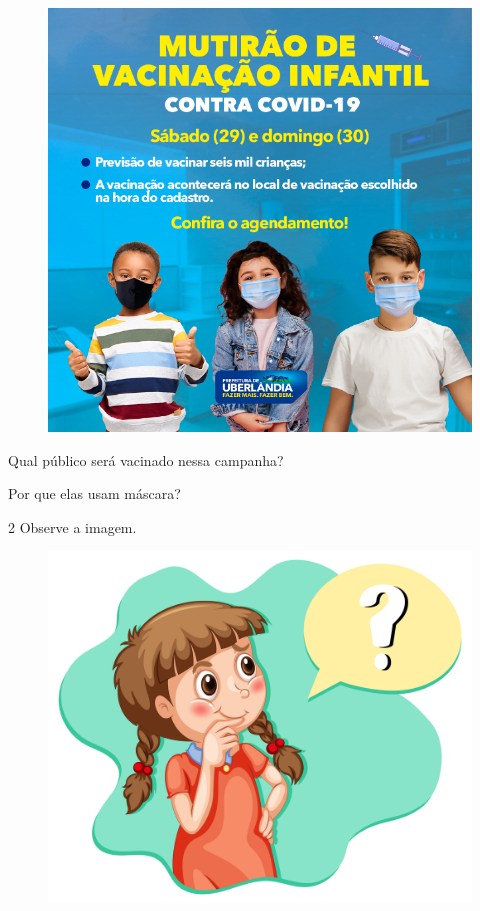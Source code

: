 \begin{figure}[H]
\centering
\includegraphics[width=.8\textwidth]{media/image128.png}
\end{figure}


\begin{escolha}
\item Qual público será vacinado nessa campanha?


\item Por que elas usam máscara?

\end{escolha}

\num{2} Observe a imagem.

\begin{figure}[H]
\centering
\includegraphics[width=.5\textwidth]{media/image205.jpg}
\end{figure}

